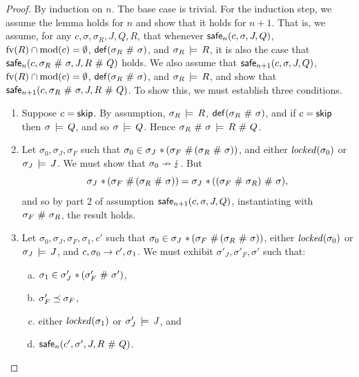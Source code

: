 \documentclass[11pt]{report}         %
\begin{document}
\begin{proof}
      By induction on $n$. The base case is trivial. For the induction step, we assume the lemma holds for $n$ and show that it holds for $n+1$. That is, we assume, for any $c,\sigma,\sigma_R,J,Q,R$, that whenever $\mathsf{safe}_{n}(c,\sigma,J,Q)$, $\mathrm{fv}(R) \cap \mathrm{mod}(c) = \operatorname{\emptyset}$, $\mathsf{def}(\sigma_R \operatorname{\,\#\,} \sigma)$, and $\sigma_R \,\models\, R$, it is also the case that $\mathsf{safe}_{n}(c,\sigma_R \operatorname{\,\#\,} \sigma,J,R \operatorname{\,\#\,} Q)$ holds. We also assume that $\mathsf{safe}_{n+1}(c,\sigma,J,Q)$, $\mathrm{fv}(R) \cap \mathrm{mod}(c) = \operatorname{\emptyset}$, $\mathsf{def}(\sigma_R \operatorname{\,\#\,} \sigma)$, and $\sigma_R \,\models\, R$, and show that \\ 
      $\mathsf{safe}_{n+1}(c,\sigma_R \operatorname{\,\#\,} \sigma,J,R \operatorname{\,\#\,} Q)$. To show this, we must establish three conditions. 

      \begin{enumerate}
            \item Suppose $c = \operatorname{\mathsf{skip}}$. By assumption, $\sigma_R \,\models\, R$, $\mathsf{def}(\sigma_R \operatorname{\,\#\,} \sigma)$, and if $c = \operatorname{\mathsf{skip}}$ then $\sigma \,\models\, Q$, and so $\sigma \,\models\, Q$. Hence $\sigma_R \operatorname{\,\#\,} \sigma \,\models\, R \operatorname{\,\#\,} Q$. 

            \item Let $\sigma_0,\sigma_J,\sigma_F$ such that $\sigma_0 \in \sigma_J \operatorname{\,\ast\,} (\sigma_F \operatorname{\,\#\,} (\sigma_R \operatorname{\,\#\,} \sigma))$, and either $\mathit{locked}(\sigma_0)$ or $\sigma_J \,\models\, J$. We must show that $\sigma_0 \nrightarrow \lightning$. But \[ \sigma_J \operatorname{\,\ast\,} (\sigma_F \operatorname{\,\#\,} (\sigma_R \operatorname{\,\#\,} \sigma)) = \sigma_J \operatorname{\,\ast\,} ((\sigma_F \operatorname{\,\#\,} \sigma_R) \operatorname{\,\#\,} \sigma),\] and so by part 2 of assumption $\mathsf{safe}_{n+1}(c,\sigma,J,Q)$, instantiating with $\sigma_F \operatorname{\,\#\,} \sigma_R$, the result holds. 

            \item Let $\sigma_0,\sigma_J,\sigma_F,\sigma_1,c'$ such that $\sigma_0 \in \sigma_J \operatorname{\,\ast\,} (\sigma_F \operatorname{\,\#\,} (\sigma_R \operatorname{\,\#\,} \sigma))$, either $\mathit{locked}(\sigma_0)$ or $\sigma_J \,\models\, J$, and $c,\sigma_0 \rightarrow c',\sigma_1$. We must exhibit $\sigma'_J,\sigma'_F,\sigma'$ such that: \begin{enumerate}[(a)]
                  \item $\sigma_1 \in \sigma'_J \operatorname{\,\ast\,} (\sigma'_F \operatorname{\,\#\,} \sigma')$,
                  \item $\sigma'_F \preceq \sigma_F$, 
                  \item either $\mathit{locked}(\sigma_1)$ or $\sigma'_J \,\models\, J$, and
                  \item $\mathsf{safe}_{n}(c',\sigma',J,R \operatorname{\,\#\,} Q)$. 
            \end{enumerate}


\end{enumerate}
\end{proof}
\end{document}
